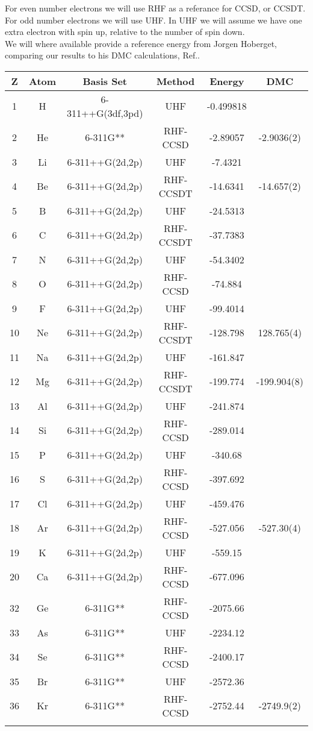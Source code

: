 For even number electrons we will use RHF as a referance for CCSD, or CCSDT. For odd number electrons we will use UHF. In UHF we will assume we have one extra electron with spin up, relative to the number of spin down. \\

We will where available provide a reference energy from Jorgen Hoberget, comparing our results to his DMC calculations, Ref.\cite{dmc_jorgens_resultater_master}. 

\begin{center}
\begin{tabular}{ c c c c c c }
	\hline
  	Z & Atom & Basis Set & Method & Energy & DMC \\ \hline
  	1 & H & 6-311++G(3df,3pd) & UHF & -0.499818
  	&  \\
  	2 & He & 6-311G** & RHF-CCSD & -2.89057 
  	& -2.9036(2) \\ \hline
  	3 & Li & 6-311++G(2d,2p) & UHF & -7.4321 
  	& \\
  	4 & Be & 6-311++G(2d,2p) & RHF-CCSDT & -14.6341 & -14.657(2) \\
  	5 & B & 6-311++G(2d,2p) & UHF & -24.5313& \\
  	6 & C & 6-311++G(2d,2p) & RHF-CCSDT & -37.7383 &\\
  	7 & N & 6-311++G(2d,2p) & UHF & -54.3402 &\\
  	8 & O & 6-311++G(2d,2p) & RHF-CCSD & -74.884& \\
  	9 & F & 6-311++G(2d,2p) & UHF & -99.4014& \\
  	10 & Ne & 6-311++G(2d,2p) & RHF-CCSDT & -128.798 & 128.765(4) \\  \hline
  	11 & Na & 6-311++G(2d,2p) & UHF & -161.847& \\
  	12 & Mg & 6-311++G(2d,2p) & RHF-CCSDT & -199.774 & -199.904(8)\\
  	13 & Al & 6-311++G(2d,2p) & UHF & -241.874& \\
  	14 & Si & 6-311++G(2d,2p) & RHF-CCSD & -289.014 &\\
  	15 & P & 6-311++G(2d,2p) & UHF & -340.68& \\ 
  	16 & S & 6-311++G(2d,2p) & RHF-CCSD & -397.692 &\\
  	17 & Cl & 6-311++G(2d,2p) & UHF & -459.476& \\
  	18 & Ar & 6-311++G(2d,2p) & RHF-CCSD & -527.056& -527.30(4) \\
  	\hline
  	19 & K & 6-311++G(2d,2p) & UHF & -559.15& \\
  	20 & Ca & 6-311++G(2d,2p) & RHF-CCSD & -677.096& \\ \hline
  	32 & Ge & 6-311G** & RHF-CCSD & -2075.66& \\
  	33 & As & 6-311G** & UHF & -2234.12& \\
  	34 & Se & 6-311G** & RHF-CCSD & -2400.17& \\
  	35 & Br & 6-311G** & UHF & -2572.36 &\\
  	36 & Kr & 6-311G** & RHF-CCSD & -2752.44& -2749.9(2) \\
  	\hline
  	\\
	\end{tabular}
\end{center}


